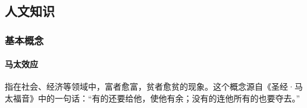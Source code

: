 \subsection{人文知识}

\subsubsection{基本概念}

\paragraph{马太效应} 指在社会、经济等领域中，富者愈富，贫者愈贫的现象。这个概念源自《圣经·马太福音》中的一句话：“有的还要给他，使他有余；没有的连他所有的也要夺去。”

